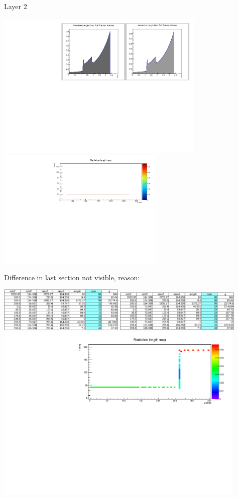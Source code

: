 \documentclass[pdftex, 11pt]{beamer}
\begin{document}
\begin{frame}{Layer 2}
  \begin{center}
    \includegraphics[width=10cm]{img/radLenLayer2.pdf}\\
    \includegraphics[width=8cm]{img/plotLayer2.pdf}
  \end{center}
\end{frame}

\begin{frame}
  Difference in last section not visible, reason:
  \begin{center}
    \includegraphics[width=6cm]{img/tabLayer1.pdf}
    \includegraphics[width=6cm]{img/tabLayer2.pdf}\\
    \includegraphics[width=12cm]{img/plot.pdf}
  \end{center}
\end{frame}
\end{document}
